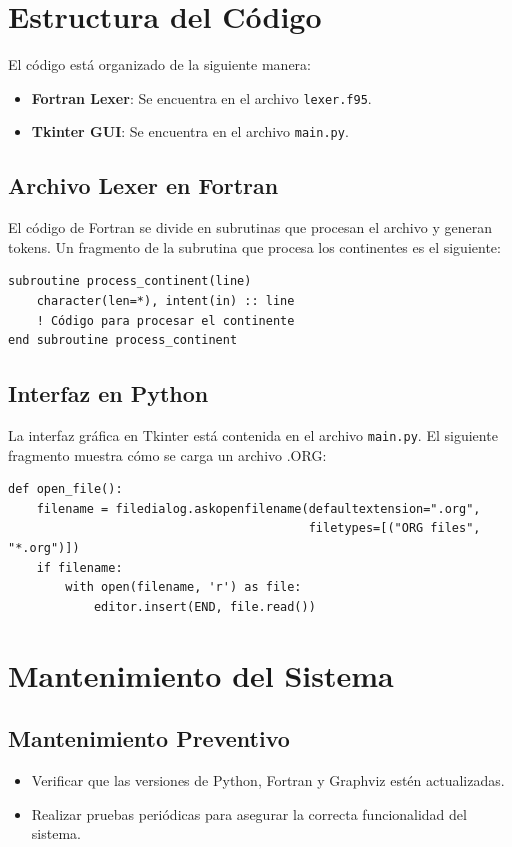 \documentclass[12pt, letterpaper, twosite]{article}
\begin{document}
\section{Estructura del Código}
El código está organizado de la siguiente manera:
\begin{itemize}
    \item \textbf{Fortran Lexer}: Se encuentra en el archivo \texttt{lexer.f95}.
    \item \textbf{Tkinter GUI}: Se encuentra en el archivo \texttt{main.py}.
\end{itemize}

\subsection{Archivo Lexer en Fortran}
El código de Fortran se divide en subrutinas que procesan el archivo y generan tokens. Un fragmento de la subrutina que procesa los continentes es el siguiente:
\begin{verbatim}
subroutine process_continent(line)
    character(len=*), intent(in) :: line
    ! Código para procesar el continente
end subroutine process_continent
\end{verbatim}

\subsection{Interfaz en Python}
La interfaz gráfica en Tkinter está contenida en el archivo \texttt{main.py}. El siguiente fragmento muestra cómo se carga un archivo .ORG:
\begin{verbatim}
def open_file():
    filename = filedialog.askopenfilename(defaultextension=".org",
                                          filetypes=[("ORG files", "*.org")])
    if filename:
        with open(filename, 'r') as file:
            editor.insert(END, file.read())
\end{verbatim}

\section{Mantenimiento del Sistema}
\subsection{Mantenimiento Preventivo}
\begin{itemize}
    \item Verificar que las versiones de Python, Fortran y Graphviz estén actualizadas.
    \item Realizar pruebas periódicas para asegurar la correcta funcionalidad del sistema.
\end{itemize}
\end{document}
